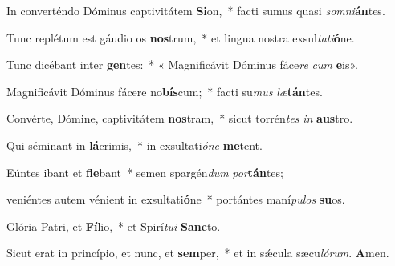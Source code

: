 \item In converténdo Dóminus captivitátem \textbf{Si}on,~* facti sumus quasi \textit{somni}\textbf{án}tes.

\item Tunc replétum est gáudio os \textbf{nos}trum,~* et lingua nostra exsul\textit{tati}\textbf{ó}ne.

\item Tunc dicébant inter \textbf{gen}tes:~* « Magnificávit Dóminus fáce\textit{re} \textit{cum} \textbf{e}is».

\item Magnificávit Dóminus fácere no\textbf{bís}cum;~* facti su\textit{mus} \textit{læ}\textbf{tán}tes.

\item Convérte, Dómine, captivitátem \textbf{nos}tram,~* sicut torrén\textit{tes} \textit{in} \textbf{aus}tro.

\item Qui séminant in \textbf{lá}crimis,~* in exsultati\textit{óne} \textbf{me}tent.

\item Eúntes ibant et \textbf{fle}bant~* semen spargén\textit{dum} \textit{por}\textbf{tán}tes;

\item veniéntes autem vénient in exsultati\textbf{ó}ne~* portántes maní\textit{pulos} \textbf{su}os.

\item Glória Patri, et \textbf{Fí}lio,~* et Spirí\textit{tui} \textbf{Sanc}to.

\item Sicut erat in princípio, et nunc, et \textbf{sem}per,~* et in sǽcula sæcu\textit{lórum}. \textbf{A}men.